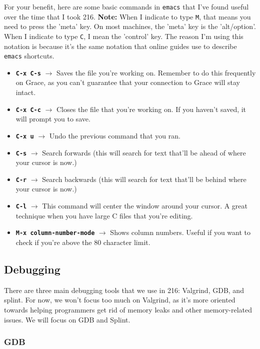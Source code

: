 \documentclass[english, 10pt]{article}
\begin{document}
For your benefit, here are some basic commands in \texttt{emacs} that I've found useful over the time that I took 216.\newline\newline
\textbf{Note:} When I indicate to type \texttt{M}, that means you need to press the 'meta' key. On most machines, the 'meta' key is the 'alt/option'. When I indicate to type \texttt{C}, I mean the 'control' key. The reason I'm using this notation is because it's the same notation that online guides use to describe \texttt{emacs} shortcuts.

\begin{itemize}
	\item \textbf{\texttt{C-x C-s}} $\rightarrow$ Saves the file you're working on. Remember to do this frequently on Grace, as you can't guarantee that your connection to Grace will stay intact.
	\item \textbf{\texttt{C-x C-c}} $\rightarrow$ Closes the file that you're working on. If you haven't saved, it will prompt you to save.
	\item \textbf{\texttt{C-x u}} $\rightarrow$ Undo the previous command that you ran.
	\item \textbf{\texttt{C-s}} $\rightarrow$ Search forwards (this will search for text that'll be ahead of where your cursor is now.)
	\item \textbf{\texttt{C-r}} $\rightarrow$ Search backwards (this will search for text that'll be behind where your cursor is now.)
	\item \textbf{\texttt{C-l}} $\rightarrow$ This command will center the window around your cursor. A great technique when you have large C files that you're editing.
	\item \textbf{\texttt{M-x column-number-mode}} $\rightarrow$ Shows column numbers. Useful if you want to check if you're above the 80 character limit.
\end{itemize}

\subsection{Debugging}

There are three main debugging tools that we use in 216: Valgrind, GDB, and splint. For now, we won't focus too much on Valgrind, as it's more oriented towards helping programmers get rid of memory leaks and other memory-related issues. We will focus on GDB and Splint.

\subsubsection{GDB}
\end{document}
